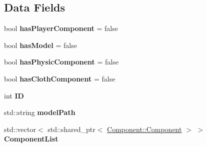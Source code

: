 \subsection*{Data Fields}
\begin{DoxyCompactItemize}
\item 
bool {\bfseries has\+Player\+Component} = false\hypertarget{class_entity_template_a5fa22e1a9509c613f4e1346bf1748722}{}\label{class_entity_template_a5fa22e1a9509c613f4e1346bf1748722}

\item 
bool {\bfseries has\+Model} = false\hypertarget{class_entity_template_af2766cf841ba16dd64b7f2a1c1029a34}{}\label{class_entity_template_af2766cf841ba16dd64b7f2a1c1029a34}

\item 
bool {\bfseries has\+Physic\+Component} = false\hypertarget{class_entity_template_afd4bf4abe3b26adf9dbce131ead0593a}{}\label{class_entity_template_afd4bf4abe3b26adf9dbce131ead0593a}

\item 
bool {\bfseries has\+Cloth\+Component} = false\hypertarget{class_entity_template_a5c69077872edc24f0ef0847ee12fb6a7}{}\label{class_entity_template_a5c69077872edc24f0ef0847ee12fb6a7}

\item 
int {\bfseries ID}\hypertarget{class_entity_template_ad427cb58611f953613755f7771f2b608}{}\label{class_entity_template_ad427cb58611f953613755f7771f2b608}

\item 
std\+::string {\bfseries model\+Path}\hypertarget{class_entity_template_afdb73a0ce60c40aafa25a4b39f7c52db}{}\label{class_entity_template_afdb73a0ce60c40aafa25a4b39f7c52db}

\item 
std\+::vector$<$ std\+::shared\+\_\+ptr$<$ \hyperlink{class_component_1_1_component}{Component\+::\+Component} $>$ $>$ {\bfseries Component\+List}\hypertarget{class_entity_template_a43acb5764c2b2ade736859cd6174b367}{}\label{class_entity_template_a43acb5764c2b2ade736859cd6174b367}

\end{DoxyCompactItemize}
